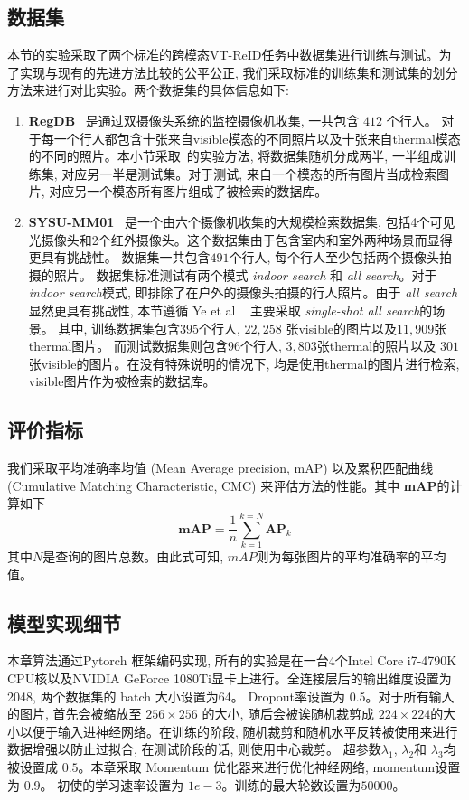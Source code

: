 \subsection{数据集}
本节的实验采取了两个标准的跨模态VT-ReID任务中数据集进行训练与测试。为了实现与现有的先进方法比较的公平公正, 我们采取标准的训练集和测试集的划分方法来进行对比实验。两个数据集的具体信息如下:
\begin{enumerate}
  \item \textbf{RegDB}~\cite{nguyen2017person} 是通过双摄像头系统的监控摄像机收集, 一共包含 $412$ 个行人。 对于每一个行人都包含十张来自visible模态的不同照片以及十张来自thermal模态的不同的照片。本小节采取~\cite{ye2018hierarchical}的实验方法, 将数据集随机分成两半, 一半组成训练集, 对应另一半是测试集。对于测试, 来自一个模态的所有图片当成检索图片, 对应另一个模态所有图片组成了被检索的数据库。 
  \item \textbf{SYSU-MM01}~\cite{wu2017rgb} 是一个由六个摄像机收集的大规模检索数据集, 包括4个可见光摄像头和2个红外摄像头。这个数据集由于包含室内和室外两种场景而显得更具有挑战性。 数据集一共包含$491$个行人, 每个行人至少包括两个摄像头拍摄的照片。 数据集标准测试有两个模式 \textit{indoor search} 和 \textit{all search}。对于 \textit{indoor search}模式, 即排除了在户外的摄像头拍摄的行人照片。由于 \textit{all search}显然更具有挑战性, 本节遵循 Ye et al ~\cite{ye2018visible} 主要采取 \textit{single-shot all search}的场景。 其中, 训练数据集包含$395$个行人, $22,258$ 张visible的图片以及$11,909$张thermal图片。 而测试数据集则包含$96$个行人, $3,803$张thermal的照片以及 $301$张visible的图片。在没有特殊说明的情况下, 均是使用thermal的图片进行检索, visible图片作为被检索的数据库。
\end{enumerate}
\subsection{评价指标}
我们采取平均准确率均值 (Mean Average precision, mAP) 以及累积匹配曲线 (Cumulative Matching Characteristic, CMC) 来评估方法的性能。其中 \textbf{mAP}的计算如下
\begin{equation}
   \textbf{mAP} = \frac{1}{n} \sum_{k=1}^{k= N} \textbf{AP}_k
\end{equation}
其中$N$是查询的图片总数。由此式可知, $mAP$则为每张图片的平均准确率的平均值。
\subsection{模型实现细节}
本章算法通过Pytorch 框架编码实现, 所有的实验是在一台4个Intel Core i7-4790K CPU核以及NVIDIA GeForce 1080Ti显卡上进行。全连接层后的输出维度设置为 2048, 两个数据集的 batch 大小设置为64。 Dropout率设置为 0.5。对于所有输入的图片, 首先会被缩放至 $256 \times 256$ 的大小, 随后会被诶随机裁剪成 $224 \times 224$的大小以便于输入进神经网络。在训练的阶段, 随机裁剪和随机水平反转被使用来进行数据增强以防止过拟合, 在测试阶段的话, 则使用中心裁剪。 超参数$\lambda_1$, $\lambda_2$和 $\lambda_3$均被设置成 $0.5$。本章采取 Momentum 优化器来进行优化神经网络, momentum设置为 $0.9$。 初使的学习速率设置为 $1e-3$。训练的最大轮数设置为$50000$。


